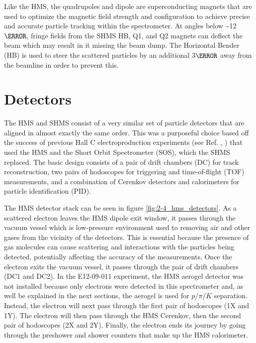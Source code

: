 \documentclass[
]{report}
\begin{document}


Like the HMS, the quadrupoles and dipole are superconducting magnets
that are used to optimize the magnetic field strength and configuration
to achieve precise and accurate particle tracking within the
spectrometer. At angles below \textasciitilde12\(\degree\), fringe
fields from the SHMS HB, Q1, and Q2 magnets can deflect the beam which
may result in it missing the beam dump. The Horizontal Bender (HB) is
used to steer the scattered particles by an additional 3\(\degree\) away
from the beamline in order to prevent this.

\hypertarget{Section-4.6}{%
\section{Detectors}\label{Section-4.6}}

The HMS and SHMS consist of a very similar set of particle detectors
that are aligned in almost exactly the same order. This was a purposeful
choice based off the success of previous Hall C electroproduction
experiments (see Ref. \cite{horn_determination_2006},
\cite{blok_charged_2008}) that used the HMS and the Short Orbit
Spectrometer (SOS), which the SHMS replaced. The basic design consists
of a pair of drift chambers (DC) for track reconstruction, two pairs of
hodoscopes for triggering and time-of-flight (TOF) measurements, and a
combination of Cerenkov detectors and calorimeters for particle
identification (PID).



The HMS detector stack can be seen in figure
\ref{fig:2-4_hms_detectors}. As a scattered electron leaves the HMS
dipole exit window, it passes through the vacuum vessel which is
low-pressure environment used to removing air and other gases from the
vicinity of the detectors. This is essential because the presence of gas
molecules can cause scattering and interactions with the particles being
detected, potentially affecting the accuracy of the measurements. Once
the electron exits the vacuum vessel, it passes through the pair of
drift chambers (DC1 and DC2). In the E12-09-011 experiment, the HMS
aerogel detector was not installed because only electrons were detected
in this spectrometer and, as well be explained in the next sections, the
aerogel is used for \(p\)/\(\pi\)/\(K\) separation. Instead, the
electron will next pass through the first pair of hodoscopes (1X and
1Y). The electron will then pass through the HMS Cerenkov, then the
second pair of hodoscopes (2X and 2Y). Finally, the electron ends its
journey by going through the preshower and shower counters that make up
the HMS calorimeter.
\end{document}
